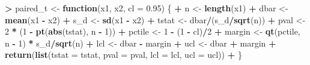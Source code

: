 \documentclass[]{krantz}
\makeatletter
\newenvironment{Shaded}{\begin{snugshade}}{\end{snugshade}}
\newcommand{\ControlFlowTok}[1]{\textcolor[rgb]{0.27,0.27,0.27}{\textbf{#1}}}
\newcommand{\DataTypeTok}[1]{\textcolor[rgb]{0.27,0.27,0.27}{#1}}
\newcommand{\DecValTok}[1]{\textcolor[rgb]{0.06,0.06,0.06}{#1}}
\newcommand{\FloatTok}[1]{\textcolor[rgb]{0.06,0.06,0.06}{#1}}
\newcommand{\KeywordTok}[1]{\textcolor[rgb]{0.27,0.27,0.27}{\textbf{#1}}}
\newcommand{\NormalTok}[1]{#1}
\newcommand{\OperatorTok}[1]{\textcolor[rgb]{0.43,0.43,0.43}{\textbf{#1}}}
\newcommand{\StringTok}[1]{\textcolor[rgb]{0.5,0.5,0.5}{#1}}
\newenvironment{kframe}{%
\medskip{}
\setlength{\fboxsep}{.8em}
 \def\at@end@of@kframe{}%
 \ifinner\ifhmode%
  \def\at@end@of@kframe{\end{minipage}}%
  \begin{minipage}{\columnwidth}%
 \fi\fi%
 \def\FrameCommand##1{\hskip\@totalleftmargin \hskip-\fboxsep
 \colorbox{shadecolor}{##1}\hskip-\fboxsep
     \hskip-\linewidth \hskip-\@totalleftmargin \hskip\columnwidth}%
 \MakeFramed {\advance\hsize-\width
   \@totalleftmargin\z@ \linewidth\hsize
   \@setminipage}}%
 {\par\unskip\endMakeFramed%
 \at@end@of@kframe}
\renewenvironment{Shaded}{\begin{kframe}}{\end{kframe}}
\makeatother
\begin{document}
\begin{Shaded}
\begin{Highlighting}[]
\OperatorTok{>}\StringTok{ }\NormalTok{paired_t <-}\StringTok{ }\ControlFlowTok{function}\NormalTok{(x1, x2, }\DataTypeTok{cl =} \FloatTok{0.95}\NormalTok{) \{}
\OperatorTok{+}\StringTok{   }\NormalTok{n <-}\StringTok{ }\KeywordTok{length}\NormalTok{(x1)}
\OperatorTok{+}\StringTok{   }\NormalTok{dbar <-}\StringTok{ }\KeywordTok{mean}\NormalTok{(x1 }\OperatorTok{-}\StringTok{ }\NormalTok{x2)}
\OperatorTok{+}\StringTok{   }\NormalTok{s_d <-}\StringTok{ }\KeywordTok{sd}\NormalTok{(x1 }\OperatorTok{-}\StringTok{ }\NormalTok{x2)}
\OperatorTok{+}\StringTok{   }\NormalTok{tstat <-}\StringTok{ }\NormalTok{dbar}\OperatorTok{/}\NormalTok{(s_d}\OperatorTok{/}\KeywordTok{sqrt}\NormalTok{(n))}
\OperatorTok{+}\StringTok{   }\NormalTok{pval <-}\StringTok{ }\DecValTok{2} \OperatorTok{*}\StringTok{ }\NormalTok{(}\DecValTok{1} \OperatorTok{-}\StringTok{ }\KeywordTok{pt}\NormalTok{(}\KeywordTok{abs}\NormalTok{(tstat), n }\OperatorTok{-}\StringTok{ }\DecValTok{1}\NormalTok{))}
\OperatorTok{+}\StringTok{   }\NormalTok{pctile <-}\StringTok{ }\DecValTok{1} \OperatorTok{-}\StringTok{ }\NormalTok{(}\DecValTok{1} \OperatorTok{-}\StringTok{ }\NormalTok{cl)}\OperatorTok{/}\DecValTok{2}
\OperatorTok{+}\StringTok{   }\NormalTok{margin <-}\StringTok{ }\KeywordTok{qt}\NormalTok{(pctile, n }\OperatorTok{-}\StringTok{ }\DecValTok{1}\NormalTok{) }\OperatorTok{*}\StringTok{ }\NormalTok{s_d}\OperatorTok{/}\KeywordTok{sqrt}\NormalTok{(n)}
\OperatorTok{+}\StringTok{   }\NormalTok{lcl <-}\StringTok{ }\NormalTok{dbar }\OperatorTok{-}\StringTok{ }\NormalTok{margin}
\OperatorTok{+}\StringTok{   }\NormalTok{ucl <-}\StringTok{ }\NormalTok{dbar }\OperatorTok{+}\StringTok{ }\NormalTok{margin}
\OperatorTok{+}\StringTok{   }\KeywordTok{return}\NormalTok{(}\KeywordTok{list}\NormalTok{(}\DataTypeTok{tstat =}\NormalTok{ tstat, }\DataTypeTok{pval =}\NormalTok{ pval, }\DataTypeTok{lcl =}\NormalTok{ lcl, }\DataTypeTok{ucl =}\NormalTok{ ucl))}
\OperatorTok{+}\StringTok{ }\NormalTok{\}}
\end{Highlighting}
\end{Shaded}

\begin{Shaded}
\end{Shaded}
\end{document}
